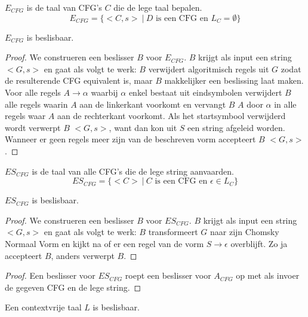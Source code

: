 \documentclass[main.tex]{subfiles}
\begin{document}
\begin{de}
  \label{de:e-cfg}
  $E_{CFG}$ is de taal van CFG's $C$ die de lege taal bepalen.
  \[ E_{CFG} = \{ <C,s>\ |\ D \text{ is een CFG en } L_{C} = \emptyset \} \]
\end{de}

\begin{st}
  \label{st:e-cfg-besl}
  $E_{CFG}$ is beslisbaar.

  \begin{proof}
    We construeren een beslisser $B$ voor $E_{CFG}$.
    $B$ krijgt als input een string $<G,s>$ en gaat als volgt te werk:
    $B$ verwijdert algoritmisch regels uit $G$ zodat de resulterende CFG equivalent is, maar $B$ makkelijker een beslissing laat maken.
    Voor alle regels $A \rightarrow \alpha$ waarbij $\alpha$ enkel bestaat uit eindsymbolen verwijdert $B$ alle regels waarin $A$ aan de linkerkant voorkomt en vervangt $B$ $A$ door $\alpha$ in alle regels waar $A$ aan de rechterkant voorkomt.
    Als het startsymbool verwijderd wordt verwerpt $B$ $<G,s>$, want dan kon uit $S$ een string afgeleid worden.
    Wanneer er geen regels meer zijn van de beschreven vorm accepteert $B$ $<G,s>$.
  \end{proof}
\end{st}

\begin{de}
  \label{de:es-cfg}
  $ES_{CFG}$ is de taal van alle CFG's die de lege string aanvaarden.
  \[ ES_{CFG} = \{ <C> \ |\ C \text{ is een CFG en } \epsilon \in L_{C}\} \]
\end{de}

\begin{st}
  \label{st:es-cfg-besl}
  $ES_{CFG}$ is beslisbaar.

  \begin{proof}
    We construeren een beslisser $B$ voor $ES_{CFG}$.
    $B$ krijgt als input een string $<G,s>$ en gaat als volgt te werk:
    $B$ transformeert $G$ naar zijn Chomsky Normaal Vorm en kijkt na of er een regel van de vorm $S \rightarrow \epsilon$ overblijft.
    Zo ja accepteert $B$, anders verwerpt $B$.
  \end{proof}

  \begin{proof}
    Een beslisser voor $ES_{CFG}$ roept een beslisser voor $A_{CFG}$ op met als invoer de gegeven CFG en de lege string.
  \end{proof}
\end{st}

\begin{st}
  \label{st:contextvrije-taal-besl}
  Een contextvrije taal $L$ is beslisbaar.

\end{st}
\end{document}
